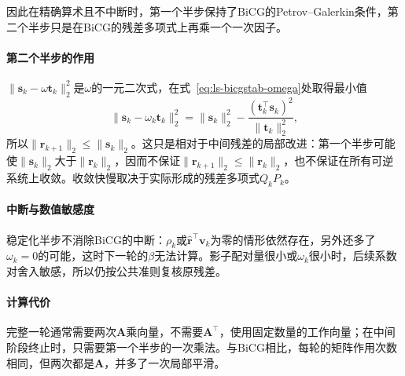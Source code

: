 因此在精确算术且不中断时，第一个半步保持了BiCG的Petrov--Galerkin条件，第二个半步只是在BiCG的残差多项式上再乘一个一次因子。

\paragraph{第二个半步的作用}
$\lVert\bm s_k-\omega\bm t_k\rVert_2^2$是$\omega$的一元二次式，在式~\eqref{eq:ls-bicgstab-omega}处取得最小值
\begin{equation}
 \lVert\bm s_k-\omega_k\bm t_k\rVert_2^2=\lVert\bm s_k\rVert_2^2-\frac{(\bm t_k^\top\bm s_k)^2}{\lVert\bm t_k\rVert_2^2},
 \label{eq:ls-bicgstab-local-decrease}
\end{equation}
所以$\lVert\bm r_{k+1}\rVert_2\le\lVert\bm s_k\rVert_2$。这只是相对于中间残差的局部改进：第一个半步可能使$\lVert\bm s_k\rVert_2$大于$\lVert\bm r_k\rVert_2$，因而不保证$\lVert\bm r_{k+1}\rVert_2\le\lVert\bm r_k\rVert_2$，也不保证在所有可逆系统上收敛。收敛快慢取决于实际形成的残差多项式$Q_kP_k$。

\paragraph{中断与数值敏感度}
稳定化半步不消除BiCG的中断：$\rho_k$或$\widehat{\bm r}^\top\bm v_k$为零的情形依然存在，另外还多了$\omega_k=0$的可能，这时下一轮的$\beta$无法计算。影子配对量很小或$\omega_k$很小时，后续系数对舍入敏感，所以仍按公共准则复核原残差。

\paragraph{计算代价}
完整一轮通常需要两次$\bm A$乘向量，不需要$\bm A^\top$，使用固定数量的工作向量；在中间阶段终止时，只需要第一个半步的一次乘法。与BiCG相比，每轮的矩阵作用次数相同，但两次都是$\bm A$，并多了一次局部平滑。
